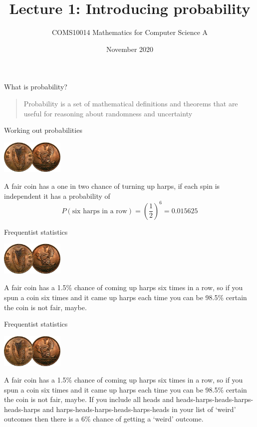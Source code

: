 \documentclass{beamer}
\title{Lecture 1: Introducing probability}
\author{COMS10014 Mathematics for Computer Science A}
\institute{\texttt{cs-uob.github.io/COMS10014/ and github.com/coms10011/2020\_21}}
\date{November 2020}
\newcommand{\crish}{\color{reddish}}
\newcommand{\cbla}{\color{black}}
\newcommand{\cblu}{\color{blue}}
\begin{document}
\maketitle
\begin{frame}{What is probability?}
  \begin{quote}
    Probability is a set of mathematical definitions and theorems that
    are useful for reasoning about randomness and uncertainty
  \end{quote}
\end{frame}

\begin{frame}{Working out probabilities}
  \begin{center}
    \includegraphics[width=3cm]{1d.jpg}
    \end{center}
  A fair coin has a one in two chance of turning up harps, if each spin is independent it has a probability of
  \crish$$P(\mbox{six harps in a row})=\left(\frac{1}{2}\right)^6=0.015625$$\cbla{}
\end{frame}

\begin{frame}{Frequentist statistics}
    \begin{center}
    \includegraphics[width=3cm]{1d.jpg}
    \end{center}
A fair coin has a 1.5\% chance of coming up harps six times in a row,
so if you spun a coin six times and it came up harps each time you can
be 98.5\% certain the coin is not fair, maybe.
\end{frame}

\begin{frame}{Frequentist statistics}
    \begin{center}
    \includegraphics[width=3cm]{1d.jpg}
    \end{center}
A fair coin has a 1.5\% chance of coming up harps six times in a row,
so if you spun a coin six times and it came up harps each time you can
be 98.5\% certain the coin is not fair, maybe.
\cblu{}
If you include all heads and heads-harps-heads-harps-heads-harps and
harps-heads-harps-heads-harps-heads in your list of `weird' outcomes
then there is a 6$\%$ chance of getting a `weird' outcome.\cbla{}
\end{frame}
\end{document}
